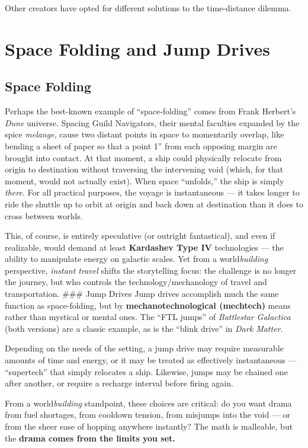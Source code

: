 \documentclass[
  letterpaper,
]{book}
\begin{document}
Other creators have opted for different solutions to the time-distance
dilemma.

\section{Space Folding and Jump
Drives}\label{space-folding-and-jump-drives}

\subsection{Space Folding}\label{space-folding}

Perhaps the best-known example of ``space-folding'' comes from Frank
Herbert's \emph{Dune} universe. Spacing Guild Navigators, their mental
faculties expanded by the spice \emph{melange}, cause two distant points
in space to momentarily overlap, like bending a sheet of paper so that a
point 1'' from each opposing margin are brought into contact. At that
moment, a ship could physically relocate from origin to destination
without traversing the intervening void (which, for that moment, would
not actually exist). When space ``unfolds,'' the ship is simply
\emph{there}. For all practical purposes, the voyage is instantaneous
--- it takes longer to ride the shuttle up to orbit at origin and back
down at destination than it does to cross between worlds.

This, of course, is entirely speculative (or outright fantastical), and
even if realizable, would demand at least \textbf{Kardashev Type IV}
technologies --- the ability to manipulate energy on galactic scales.
Yet from a world\emph{building} perspective, \emph{instant travel}
shifts the storytelling focus: the challenge is no longer the journey,
but who controls the technology/mechanology of travel and
transportation. \#\#\# Jump Drives Jump drives accomplish much the same
function as space-folding, but by \textbf{mechanotechnological
(mechtech)} means rather than mystical or mental ones. The ``FTL jumps''
of \emph{Battlestar Galactica} (both versions) are a classic example, as
is the ``blink drive'' in \emph{Dark Matter}.

Depending on the needs of the setting, a jump drive may require
measurable amounts of time and energy, or it may be treated as
effectively instantaneous --- ``supertech'' that simply relocates a
ship. Likewise, jumps may be chained one after another, or require a
recharge interval before firing again.

From a world\emph{building} standpoint, these choices are critical: do
you want drama from fuel shortages, from cooldown tension, from misjumps
into the void --- or from the sheer ease of hopping anywhere instantly?
The math is malleable, but the \textbf{drama comes from the limits you
set.}
\end{document}
